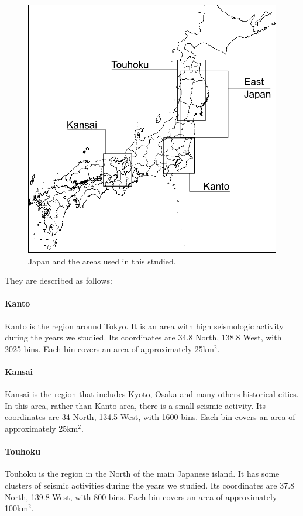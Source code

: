 \begin{figure}[H]
	\centering
	\includegraphics[scale=0.25]{img/alljapan.png}
	\caption{Japan and the areas used in this studied.}
	\label{alljapan}
\end{figure}


They are described as follows:

\paragraph{Kanto} Kanto is the region around Tokyo. It is an area with high seismologic activity during the years we studied. Its coordinates are 34.8 North, 138.8 West, with  2025 bins. Each bin covers an area of approximately 25km$^2$.

\paragraph{Kansai} Kansai is the region that includes Kyoto, Osaka and many others historical cities. In this area, rather than Kanto area, there is a small seismic activity. Its coordinates are 34 North, 134.5 West, with 1600 bins. Each bin covers an area of approximately 25km$^2$.

\paragraph{Touhoku} Touhoku is the region in the North of the main Japanese island. It has some clusters of seismic activities during the years we studied. Its coordinates are 37.8 North, 139.8 West, with  800 bins. Each bin covers an area of approximately 100km$^2$. 

